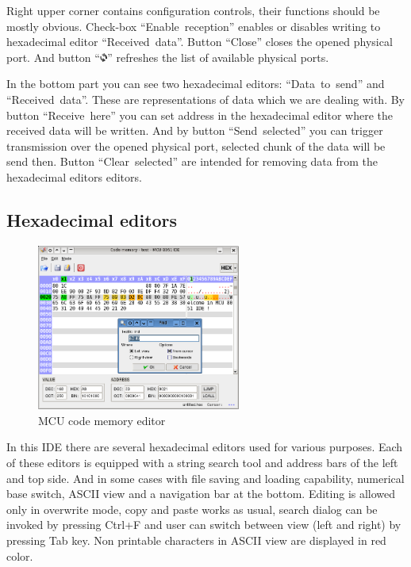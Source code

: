 \documentclass[a4paper,twoside,12pt]{book}
\begin{document}
			Right upper corner contains configuration controls, their functions should be mostly obvious. Check-box ``Enable~reception'' enables or disables writing to hexadecimal editor ``Received~data''. Button ``Close'' closes the opened physical port. And button ``\includegraphics[height=8pt]{img/reload.png}'' refreshes the list of available physical ports.

			In the bottom part you can see two hexadecimal editors: ``Data~to~send'' and ``Received~data''. These are representations of data which we are dealing with. By button ``Receive~here'' you can set address in the hexadecimal editor where the received data will be written. And by button ``Send~selected'' you can trigger transmission over the opened physical port, selected chunk of the data will be send then. Button ``Clear~selected'' are intended for removing data from the hexadecimal editors editors.

		\subsection{Hexadecimal editors}
			\begin{figure}
				\centering{}
				\includegraphics[width=190pt]{img/023.png}
				\caption{MCU code memory editor}
			\end{figure}
			In this IDE there are several hexadecimal editors used for various purposes. Each of these editors is equipped with a string search tool and address bars of the left and top side. And in some cases with file saving and loading capability, numerical base switch, ASCII view and a navigation bar at the bottom. Editing is allowed only in overwrite mode, copy and paste works as usual, search dialog can be invoked by pressing Ctrl+F and user can switch between view (left and right) by pressing Tab key. Non printable characters in ASCII view are displayed in red color.
\end{document}
